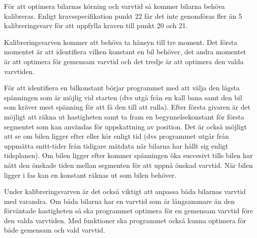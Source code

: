 För att optimera bilarnas körning och varvtid så kommer bilarna behöva
kalibreras. Enligt kravsspecifikation punkt 22 får det inte genomföras fler än
5 kalibreringsvarv för att uppfylla kraven till punkt 20 och 21.

Kalibreringsvarven kommer att behöva ta hänsyn till tre moment. Det första momentet är att
identifiera vilken konstant en bil behöver, det andra momentet är att optimera för
gemensam varvtid och det tredje är att optimera den valda varvtiden.


För att identifiera en bilkonstant börjar programmet med att välja den lägsta spänningen som är möjlig vid starten (dvs utgå från en kall bana samt den bil som kräver mest spänning för att få den till att rulla). Efter första givaren är det möjligt att räkna ut hastigheten samt ta fram en begynnelsekonstant för första segmentet som kan användas för uppskattning av position. Det är också möjligt att se om bilen ligger efter eller kör enligt tid (dvs programmet utgår från uppmätta snitt-tider från tidigare mätdata när bilarna har hållt sig enligt tidsplanen). Om bilen ligger efter kommer spänningen öka succesivt tills bilen har nått den önskade tiden mellan segmenten för att uppnå önskad varvtid. När bilen ligger i fas kan en konstant räknas ut som bilen behöver. 

Under
kalibreringsvarven är det också viktigt att anpassa båda bilarnas varvtid med
varandra. Om båda bilarna har en varvtid som är långsammare än den förväntade
hastigheten så ska programmet optimera för en gemensam varvtid före den valda
varvtiden. Med funktioner ska programmet också kunna optimera för både
gemensam och vald varvtid.

